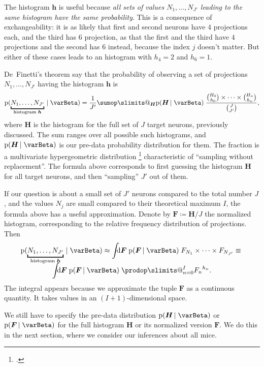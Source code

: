 \documentclass[\ifafour a4paper,12pt,\else a5paper,10pt,\fi%
onecolumn,oneside,article,%
british%
]{memoir}
\makeatletter
\theoremstyle{remark}
\theoremstyle{innote}
\def\sum{\DOTSI\sumop\slimits@}
\def\prod{\DOTSI\prodop\slimits@}
\newcommand*{\citep}{\footcites}
\newcommand*{\di}{\mathrm{d}}%
\newcommand*{\defd}{\coloneqq}
\newcommand*{\pf}{\mathrm{p}}%
\renewcommand*{\|}[1][]{\nonscript\,#1\vert\nonscript\;\mathopen{}}
\newcommand*{\chap}{ch.}%
\newcommand*{\yI}{\varBeta}
\newcommand*{\yF}{\bm{F}}
\newcommand*{\yh}{\bm{h}}
\newcommand*{\yH}{\bm{H}}
\makeatother
\begin{document}
The histogram $\yh$ is useful because \emph{all sets of values
  $N_{1},\dotsc,N_{J'}$ leading to the same histogram have the same
  probability}. This is a consequence of exchangeability: it is as likely
that first and second neurons have $4$ projections each, and the third has
$6$ projection, as that the first and the third have $4$ projections and
the second has $6$ instead, because the index $j$ doesn't matter. But
either of these cases leads to an histogram with $h_{4}=2$ and $h_{6}=1$.

De~Finetti's theorem say that the probability of observing a set of
projections $N_{1},\dotsc,N_{J'}$ having the histogram $\yh$ is
\begin{equation}
  \label{eq:definetti_Nj_finite}
  \pf(\underbracket{N_{1},\dotsc,N_{J'}}_{\text{histogram $\yh$}} \| \yI) =
\frac{1}{J'}  \sum_{\yH} \pf(\yH \| \yI)\;
  \frac{\binom{H_{0}}{h_{0}}\times\dotsm\times\binom{H_{n}}{h_{n}}}{\binom{J}{J'}},
\end{equation}
where $\yH$ is the histogram for the full set of $J$ target neurons,
previously discussed. The sum ranges over all possible such histograms, and
$\pf(\yH \| \yI)$ is our pre-data probability distribution for them. The
fraction is a multivariate hypergeometric distribution
\citep[\chap~39]{johnsonetal1969_r1996} characteristic of \enquote{sampling
  without replacement}. The formula above corresponds to first guessing the
histogram $\yH$ for all target neurons, and then \enquote{sampling} $J'$
out of them.

If our question is about a small set of $J'$ neurons compared to the total
number $J$, and the values $N_{j}$ are small compared to their theoretical
maximum $I$, the formula above has a useful approximation. Denote by
$\yF \defd \yH/J$ the normalized histogram, corresponding to the relative
frequency distribution of projections. Then
\begin{multline}
  \label{eq:definetti_Nj_infinite_approx}
  \pf(\underbracket{N_{1},\dotsc,N_{J'}}_{\text{histogram $\yh$}} \| \yI) \approx
\int\!\!\!\di\yF\;
\pf(\yF \| \yI)\; F_{N_{1}} \times \dotsm \times F_{N_{J'}}
\equiv{}\\[-2\jot]
\int\!\!\!\di\yF\;
\pf(\yF \| \yI)\; \prod_{n=0}^{I}{F_{n}}^{h_{n}}.
\end{multline}
The integral appears because we approximate the tuple $\yF$ as a continuous
quantity. It takes values in an $(I+1)$-dimensional space.


We still have to specify the pre-data distribution $\pf(\yH \| \yI)$ or
$\pf(\yF \| \yI)$ for the full histogram $\yH$ or its normalized version
$\yF$. We do this in the next section, where we consider our inferences
about all mice.
\end{document}
